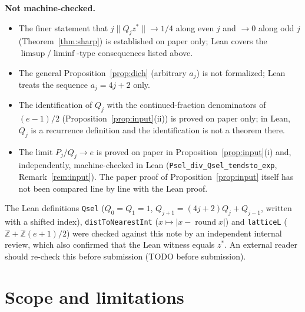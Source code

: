 \documentclass[11pt]{amsart}
\theoremstyle{remark}
\newcommand{\dist}[1]{\lVert #1\rVert}
\begin{document}
\medskip\noindent\textbf{Not machine-checked.}
\begin{itemize}
\item The finer statement that $j\dist{Q_jz^*}\to1/4$ along even $j$ and $\to0$ along odd $j$
(Theorem~\ref{thm:sharp}) is established on paper only; Lean covers the $\limsup/\liminf$-type
consequences listed above.
\item The general Proposition~\ref{prop:dich} (arbitrary $a_j$) is not formalized; Lean treats the
sequence $a_j=4j+2$ only.
\item The identification of $Q_j$ with the continued-fraction denominators of $(e-1)/2$
(Proposition~\ref{prop:input}(ii)) is proved on paper only; in Lean, $Q_j$ is a recurrence definition
and the identification is not a theorem there.
\item The limit $P_j/Q_j\to e$ is proved on paper in Proposition~\ref{prop:input}(i) and, independently,
machine-checked in Lean (\texttt{Psel\_div\_Qsel\_tendsto\_exp}, Remark~\ref{rem:input}). The paper proof
of Proposition~\ref{prop:input} itself has not been compared line by line with the Lean proof.
\end{itemize}
The Lean definitions \texttt{Qsel} ($Q_0=Q_1=1$, $Q_{j+1}=(4j+2)Q_j+Q_{j-1}$, written with a
shifted index), \texttt{distToNearestInt} ($x\mapsto|x-\operatorname{round}x|$) and \texttt{latticeL}
($\mathbb Z+\mathbb Z(e+1)/2$) were checked against this note by an independent internal review,
which also confirmed that the Lean witness equals $z^*$. An external reader should re-check this
before submission (TODO before submission).

\section{Scope and limitations}\label{sec:scope}
\end{document}
